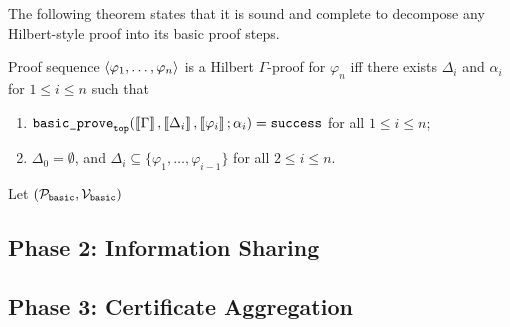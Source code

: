 \documentclass{article}
\begin{document}
The following theorem states that it is sound and complete
to decompose any Hilbert-style proof into its basic proof steps. 

\begin{theorem}
Proof sequence $\left\langle \varphi_1,\dots,\varphi_n \right\rangle$ is a Hilbert $\Gamma$-proof
for $\varphi_n$ iff 
there exists $\Delta_i$ and $\alpha_i$ for $1 \le i \le n$ such that
\begin{enumerate}
\item $\textnormal{\texttt{basic\_prove}}_{\textnormal{\texttt{top}}}(\left\llbracket \Gamma \right\rrbracket, \left\llbracket \Delta_{i} \right\rrbracket, \left\llbracket \varphi_{i} \right\rrbracket ; \alpha_i) = \textnormal{\texttt{success}}$
      for all $1 \le i \le n$;
\item $\Delta_0 = \emptyset$, and 
      $\Delta_i \subseteq \{\varphi_1,\dots,\varphi_{i-1}\}$ 
      for all $2 \le i \le n$.
\end{enumerate}
\end{theorem}

Let $(\mathcal{P}_{\textnormal{\texttt{basic}}}, \mathcal{V}_{\textnormal{\texttt{basic}}})$

\subsection{Phase 2: Information Sharing}

\subsection{Phase 3: Certificate Aggregation}
\end{document}
